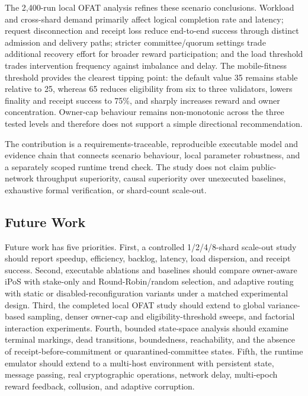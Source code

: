 \documentclass[a4paper,fleqn]{cas-sc}
\begin{document}
The 2,400-run local OFAT analysis refines these scenario conclusions. Workload
and cross-shard demand primarily affect logical completion rate and latency;
request disconnection and receipt loss reduce end-to-end success through
distinct admission and delivery paths; stricter committee/quorum settings trade
additional recovery effort for broader reward participation; and the load
threshold trades intervention frequency against imbalance and delay. The
mobile-fitness threshold provides the clearest tipping point: the default value
35 remains stable relative to 25, whereas 65 reduces eligibility from six to
three validators, lowers finality and receipt success to 75\%, and sharply
increases reward and owner concentration. Owner-cap behaviour remains
non-monotonic across the three tested levels and therefore does not support a
simple directional recommendation.

The contribution is a requirements-traceable, reproducible executable model and
evidence chain that connects scenario behaviour, local parameter robustness,
and a separately scoped runtime trend check. The study does not claim
public-network throughput superiority, causal superiority over unexecuted
baselines, exhaustive formal verification, or shard-count scale-out.

\subsection{Future Work}
\label{subsec:future_work}

Future work has five priorities. First, a controlled 1/2/4/8-shard scale-out
study should report speedup, efficiency, backlog, latency, load dispersion, and
receipt success. Second, executable ablations and baselines should compare
owner-aware iPoS with stake-only and Round-Robin/random selection, and adaptive
routing with static or disabled-reconfiguration variants under a matched
experimental design. Third, the completed local OFAT study should extend to
global variance-based sampling, denser owner-cap and eligibility-threshold
sweeps, and factorial interaction experiments. Fourth, bounded state-space
analysis should examine terminal markings, dead transitions, boundedness,
reachability, and the absence of receipt-before-commitment or
quarantined-committee states. Fifth, the runtime emulator should extend to a
multi-host environment with persistent state, message passing, real
cryptographic operations, network delay, multi-epoch reward feedback,
collusion, and adaptive corruption.
\end{document}
